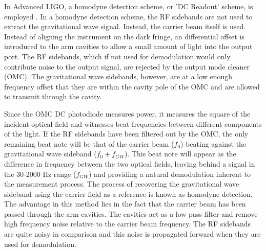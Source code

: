 In Advanced LIGO, a homodyne detection scheme, or 'DC Readout' scheme, is employed 
\cite{DCReadout}. 
In a homodyne detection scheme, the RF sidebands are not used to extract the 
gravitational wave signal. Instead, the carrier beam itself is used. Instead of 
aligning the instrument on the dark fringe, an differential offset is introduced 
to the arm cavities to allow a small amount of light into the output port. 
The RF sidebands, which if not used for demodulation would only contribute 
noise to the output signal, 
are rejected by the output mode cleaner (OMC). 
The gravitational wave sidebands, however, are at a 
low enough frequency offset that they are within the cavity pole of the OMC 
and are allowed to transmit through the cavity.

Since the OMC DC photodiode measures power, it measures the square of the 
incident optical field and witnesses beat frequencies between different 
components of the light. If the RF sidebands have been filtered out by 
the OMC, the only remaining beat note will be that of the carrier beam ($f_0$) 
beating against the gravitational wave sideband ($f_0 + f_{GW}$). This beat note will 
appear as the difference in frequency between the two optical fields, 
leaving behind a signal in the 30-2000 Hz range ($f_{GW}$) and providing a 
natural demodulation inherent to the measurement process. 
The process of recovering the gravitational wave sideband using the 
carrier field as a reference is known as homodyne detection. The 
advantage in this method lies in the fact that the carrier beam 
has been passed through the arm cavities. The cavities act as a low 
pass filter and remove high frequency noise relative to the carrier 
beam frequency. The RF sidebands are quite noisy in comparison and this 
noise is propagated forward when they are used for demodulation. 

